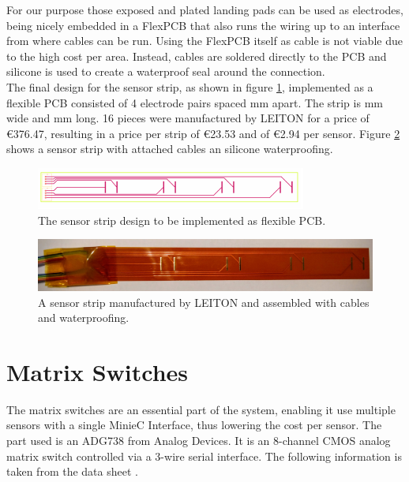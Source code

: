 For our purpose those exposed and plated landing pads can be used as electrodes, being nicely embedded in a FlexPCB that also runs the wiring up to an interface from where cables can be run. Using the FlexPCB itself as cable is not viable due to the high cost per area. Instead, cables are soldered directly to the PCB and silicone is used to create a waterproof seal around the connection.\\

The final design for the sensor strip, as shown in figure \ref{fig:fpcbd}, implemented as a flexible PCB consisted of 4 electrode pairs spaced \unit[50]{mm} apart. The strip is \unit[25]{mm} wide and \unit[220]{mm} long. 16 pieces were manufactured by LEITON for a price of \euro{376.47}, resulting in a price per strip of \euro{23.53} and of \euro{2.94} per sensor. Figure \ref{fig:fpcbp} shows a sensor strip with attached cables an silicone waterproofing.

\begin{figure}
	\begin{center}
		\includegraphics[width=\textwidth]{images/fpcbd.pdf} 
		\caption{The sensor strip design to be implemented as flexible PCB.}
		\label{fig:fpcbd}
	\end{center}
\end{figure}

\begin{figure}
	\begin{center}
		\includegraphics[width=\textwidth]{images/fpcbp.jpg} 
		\caption{A sensor strip manufactured by LEITON and assembled with cables and waterproofing.}
		\label{fig:fpcbp}
	\end{center}
\end{figure}

\section{Matrix Switches}

The matrix switches are an essential part of the system, enabling it use multiple sensors with a single MinieC Interface, thus lowering the cost per sensor. The part used is an ADG738 from Analog Devices. It is an 8-channel CMOS analog matrix switch controlled via a 3-wire serial interface. The following information is taken from the data sheet \cite{ms}.\\

